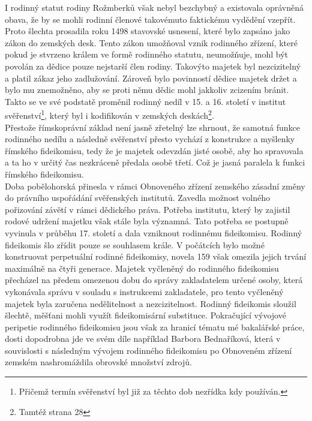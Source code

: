 \documentclass{article}
\begin{document}
I rodinný statut rodiny Rožmberků však nebyl bezchybný a existovala oprávněná obava, že by se mohli rodinní členové takovémuto faktickému vydědění vzepřít. Proto šlechta prosadila roku 1498 stavovské usnesení, které bylo zapsáno jako zákon do zemských desk. Tento zákon umožňoval vznik rodinného zřízení, které pokud je stvrzeno králem ve formě rodinného statutu, neumožňuje, mohl být povolán za dědice pouze nejstarší člen rodiny. Takovýto majetek byl nezcizitelný a platil zákaz jeho zadlužování. Zároveň bylo povinností dědice majetek držet a bylo mu znemožněno, aby se proti němu dědic mohl jakkoliv zcizením bránit. Takto se ve své podstatě proměnil rodinný nedíl v 15. a 16. století v institut svěřenství\footnote{Přičemž termín svěřenství byl již za těchto dob nezřídka kdy používán.}, který byl i kodifikován v zemských deskách\footnote{Tamtéž strana 28}.\\ 

Přestože římskoprávní základ není jasně zřetelný lze shrnout, že samotná funkce rodinného nedílu a následně svěřenství přesto vychází z konstrukce a myšlenky římského fideikomisu, tedy že je majetek odevzdán jisté osobě, aby ho spravovala a ta ho v určitý čas nezkráceně předala osobě třetí. Což je jasná paralela k funkci římského fideikomisu.\\

Doba pobělohorská přinesla v rámci Obnoveného zřízení zemského zásadní změny do právního uspořádání svěřenských institutů. Zavedla možnost volného pořizování závětí v rámci dědického práva. Potřeba institutu, který by zajistil rodové udržení majetku však stále byla významná. Tato potřeba se postupně vyvinula v průběhu 17. století a dala vzniknout rodinnému fideikomisu. Rodinný fideikomis šlo zřídit pouze se souhlasem krále. V počátcích bylo možné konstruovat perpetuální rodinné fideikomisy, novela 159 však omezila jejich trvání maximálně na čtyři generace. Majetek vyčleněný do rodinného fideikomisu přecházel na předem omezenou dobu do správy zakladatelem určené osoby, která vykonávala správu v souladu s instrukcemi zakladatele, pro tento vyčleněný majetek byla zaručena nedělitelnost a nezcizitelnost. Rodinný fideikomis sloužil šlechtě, měšťani mohli využít fideikomisární substituce. Pokračující vývojové peripetie rodinného fideikomisu jsou však za hranicí tématu mé bakalářské práce, dosti dopodrobna jde ve svém díle například Barbora Bednaříková, která v souvislosti s následným vývojem rodinného fideikomisu po Obnoveném zřízení zemském nashromáždila obrovské množství zdrojů.\\
\end{document}

